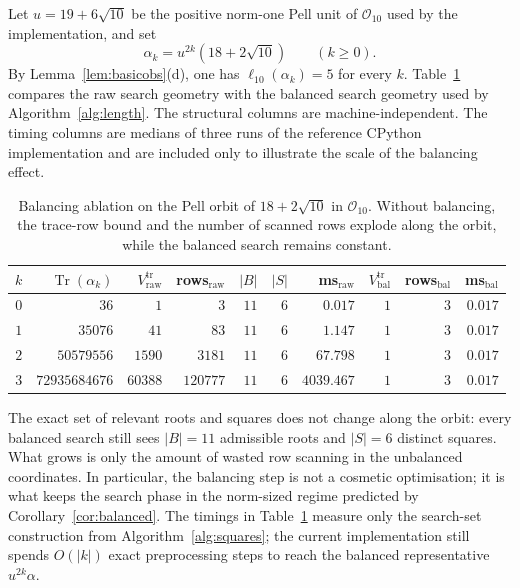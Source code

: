 \documentclass[manuscript,screen]{acmart}
\renewcommand{\ge}{\geqslant}
\theoremstyle{plain}
\theoremstyle{definition}
\theoremstyle{nonitalicremark}
\newcommand{\OO}{\mathcal{O}}
\newcommand{\len}{\ell}
\newcommand{\Tr}{\operatorname{Tr}}
\begin{document}
Let $u=19+6\sqrt{10}$ be the positive norm-one Pell unit of $\OO_{10}$ used by the implementation,
and set
\[
\alpha_k = u^{2k}(18+2\sqrt{10}) \qquad (k\ge 0).
\]
By Lemma~\ref{lem:basicobs}(d), one has $\len_{10}(\alpha_k)=5$ for every $k$.
Table~\ref{tab:ablation} compares the raw search geometry with the balanced search geometry used by
Algorithm~\ref{alg:length}. The structural columns are machine-independent. The timing columns are
medians of three runs of the reference CPython implementation and are included only to illustrate
the scale of the balancing effect.

\begin{table}[tbp]
\centering
\small
\renewcommand{\arraystretch}{1.12}
\begin{tabular}{rrrrrrrrrr}
\toprule
$k$ & $\Tr(\alpha_k)$ & $V^{\mathrm{tr}}_{\mathrm{raw}}$ & rows$_{\mathrm{raw}}$ & $|B|$ & $|S|$ & ms$_{\mathrm{raw}}$ & $V^{\mathrm{tr}}_{\mathrm{bal}}$ & rows$_{\mathrm{bal}}$ & ms$_{\mathrm{bal}}$ \\
\midrule
$0$ & $36$ & $1$ & $3$ & $11$ & $6$ & $0.017$ & $1$ & $3$ & $0.017$ \\
$1$ & $35076$ & $41$ & $83$ & $11$ & $6$ & $1.147$ & $1$ & $3$ & $0.017$ \\
$2$ & $50579556$ & $1590$ & $3181$ & $11$ & $6$ & $67.798$ & $1$ & $3$ & $0.017$ \\
$3$ & $72935684676$ & $60388$ & $120777$ & $11$ & $6$ & $4039.467$ & $1$ & $3$ & $0.017$ \\
\bottomrule
\end{tabular}
\caption{Balancing ablation on the Pell orbit of $18+2\sqrt{10}$ in $\OO_{10}$. Without balancing, the trace-row bound and the number of scanned rows explode along the orbit, while the balanced search remains constant.}
\label{tab:ablation}
\end{table}

The exact set of relevant roots and squares does not change along the orbit: every balanced search
still sees $|B|=11$ admissible roots and $|S|=6$ distinct squares. What grows is only the amount
of wasted row scanning in the unbalanced coordinates. In particular, the balancing step is not a
cosmetic optimisation; it is what keeps the search phase in the norm-sized regime predicted by
Corollary~\ref{cor:balanced}. The timings in Table~\ref{tab:ablation} measure only the search-set
construction from Algorithm~\ref{alg:squares}; the current implementation still spends $O(|k|)$
exact preprocessing steps to reach the balanced representative $u^{2k}\alpha$.
\end{document}
